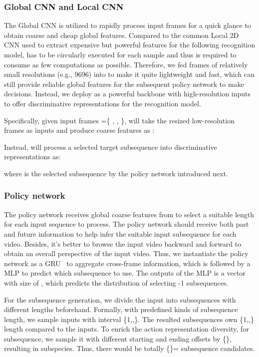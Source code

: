 \documentclass[sigconf]{acmart}
\begin{document}
\subsubsection{Global CNN  and Local CNN }
The Global CNN  is utilized to rapidly process input frames for a quick glance to obtain coarse and cheap global features. Compared to the common Local 2D CNN  used to extract expensive but powerful features for the following recognition model,  has to be circularly executed for each sample and thus is required to consume as few computations as possible. Therefore, we fed frames of relatively small resolutions (e.g., 9696) into  to make it quite lightweight and fast, which can still provide reliable global features for the subsequent policy network  to make decisions. Instead, we deploy  as a powerful backbone with high-resolution inputs to offer discriminative representations for the recognition model. 
  
Specifically, given  input frames =\{ , , \},  will take the resized low-resolution frames as inputs and produce coarse features  as :
   
Instead,  will process a selected target subsequence into discriminative representations as:
   
where  is the selected subsequence by the policy network  introduced next.
  
\subsubsection{Policy network }
The policy network  receives global coarse features  from  to select a suitable length for each input sequence to process. The policy network should receive both past and future information to help infer the suitable input subsequence for each video. Besides, it's better to browse the input video backward and forward to obtain an overall perspective of the input video. Thus, we instantiate the policy network  as a GRU~\cite{cho2014learning} to aggregate cross-frame information, which is followed by a MLP to predict which subsequence to use. The outputs of the MLP is a vector  with size of , which predicts the distribution of selecting -1 subsequences.

For the subsequence generation, we divide the input into subsequences with different lengths beforehand. Formally, with predefined  kinds of subsequence length, we sample inputs with interval \{1,,\}. The resulted subsequences own \{1,,\} length compared to the inputs. To enrich the action representation diversity, for  subsequence, we sample it with different starting and ending offsets by \{\}, resulting in  subspecies. Thus, there would be totally \{\}=  subsequence candidates. 
\end{document}
